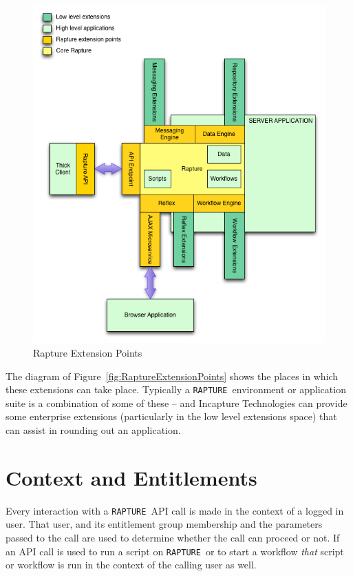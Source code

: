 \documentclass[12pt,twoside,a4paper]{book}
\newcommand{\Rapture}{\Verb+RAPTURE+~}
\begin{document}
\begin{figure}[H]
\centering
\includegraphics[scale=0.75]{Graphics/RaptureExtensionPoints}
\caption{Rapture Extension Points}
\label{fig:RaptureExtensionPoints}
\end{figure}

The diagram of Figure~\vref{fig:RaptureExtensionPoints} shows the places in which these extensions can take
place. Typically a \Rapture environment or application suite is a combination of some of these -- and Incapture Technologies
can provide some enterprise extensions (particularly in the low level extensions space) that can assist in rounding out an
application.

\section{Context and Entitlements}
Every interaction with a \Rapture API call is made in the context of a logged in
user. That user, and its entitlement group membership and the parameters passed
to the call are used to determine whether the call can proceed or not. If an
API call is used to run a script on \Rapture or to start a workflow \emph{that} script
or workflow is run in the context of the calling user as well.
\end{document}

